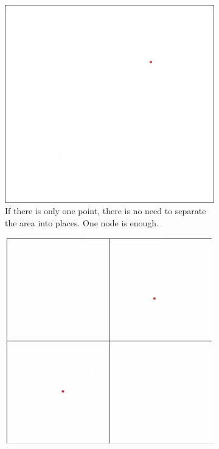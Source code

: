 \begin{center}
\begin{figure}[H]
    \centering
    \begin{subfigure}[t]{0.38\textwidth}
        \centering
        \includegraphics[width=\linewidth]{images/task4_quad2.png}
        \caption{If there is only one point, there is no need to separate the area into places. One node is enough.}
        \label{fig:subfig2}
    \end{subfigure}%
    \hspace{0.02\textwidth}
    \begin{subfigure}[t]{0.38\textwidth}
        \centering
        \includegraphics[width=\linewidth]{images/task4_quad3.png}

\end{subfigure}
\end{figure}
\end{center}
